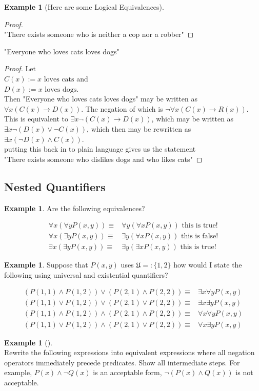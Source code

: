 \documentclass[letterpaper,10pt]{article}
\theoremstyle{plain}
\theoremstyle{definition}
\newtheorem{exmp}[thm]{Example}
\theoremstyle{remark}
\providecommand{\land}{\ensuremath{\wedge}}
\providecommand{\lor}{\ensuremath{\vee}}
\begin{document}
\begin{exmp}[Here are some Logical Equivalences]
\begin{proof}
\\"There exists someone who is neither a cop nor a robber"
\end{proof}
"Everyone who loves cats loves dogs"
\begin{proof}
Let 
\\$C(x):=\text{$x$ loves cats}$ and
\\$D(x):=\text{$x$ loves dogs}$.
\\Then "Everyone who loves cats loves dogs" may be written as $\forall x (C(x) \to D(x))$.
The negation of which is $\lnot \forall x (C(x) \to R(x))$.
\\ This is equivalent to $\exists x \lnot (C(x) \to D(x))$, which may be written as $\exists x \lnot ( D(x) \lor \lnot C(x) )$, which then may be rewritten as $\exists x ( \lnot D(x) \land C(x) )$.
\\ putting this back in to plain language gives us the statement
\\"There exists someone who dislikes dogs and who likes cats"
\end{proof}

\subsection{Nested Quantifiers}

\begin{exmp}
Are the following equivalences?

\begin{align}
\forall x (\forall y P(x,y))\equiv & \forall y (\forall x P(x,y)) \text{ this is true!}\\
\forall x (\exists y P(x,y))\equiv & \exists y (\forall x P(x,y)) \text{ this is false!}\\
\exists x (\exists y P(x,y))\equiv & \exists y (\exists x P(x,y)) \text{ this is true!}
\end{align}
\end{exmp}
\begin{exmp}
Suppose that $P(x,y)$ uses $\mathfrak{U}=:\{1,2\}$ how would I state the following using universal and existential quantifiers?


\begin{align}
(P(1,1)\land P(1,2))\lor(P(2,1) \land P(2,2))\equiv & \exists x \forall y P(x,y)\\
(P(1,1)\lor P(1,2))\lor(P(2,1) \lor P(2,2))\equiv & \exists x \exists y P(x,y)\\
(P(1,1)\land P(1,2))\land(P(2,1) \land P(2,2))\equiv &\forall x \forall y P(x,y)\\
(P(1,1)\lor P(1,2))\land(P(2,1) \lor P(2,2))\equiv &\forall x \exists y P(x,y)
\end{align}
\end{exmp}
\newpage
\begin{exmp}[]\ \\
Rewrite the following expressions into equivalent expressions where all negation operators immediately precede predicates. Show all intermediate steps. For example, $P(x) \land \lnot Q(x)$ is an acceptable form, $\lnot(P(x) \land Q(x))$ is not acceptable.


\end{exmp}
\end{exmp}
\end{document}
